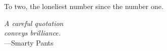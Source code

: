 %
\begin{frontmatter}

%
%
\makefrontmatter 

%
%   
%
%
%
%
\begin{dedication} 
  To two, the loneliest number since the number one.
\end{dedication}


%   
% 



%
%
\begin{epigraph} %
  \emph{A careful quotation\\
  conveys brilliance.}\\
  ---Smarty Pants
\end{epigraph}

% 



\end{frontmatter}
